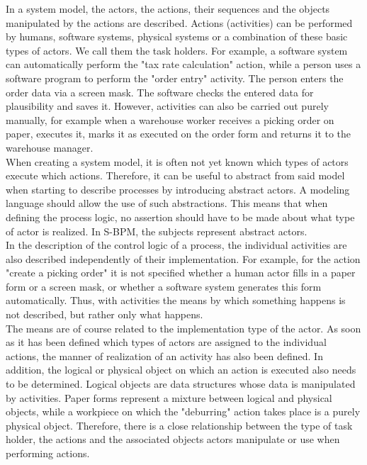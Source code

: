 In a system model, the actors, the actions, their sequences and the objects manipulated by the actions are described. Actions (activities) can be performed by humans, software systems, physical systems or a combination of these basic types of actors. We call them the task holders. For example, a software system can automatically perform the "tax rate calculation" action, while a person uses a software program to perform the "order entry" activity. The person enters the order data via a screen mask. The software checks the entered data for plausibility and saves it. However, activities can also be carried out purely manually, for example when a warehouse worker receives a picking order on paper, executes it, marks it as executed on the order form and returns it to the warehouse manager.\\ 
When creating a system model, it is often not yet known which types of actors execute which actions. Therefore, it can be useful to abstract from said model when starting to describe processes by introducing abstract actors. A modeling language should allow the use of such abstractions. This means that when defining the process logic, no assertion should have to be made about what type of actor is realized. In S-BPM, the subjects represent abstract actors. \\
In the description of the control logic of a process, the individual activities are also described independently of their implementation. For example, for the action "create a picking order" it is not specified whether a human actor fills in a paper form or a screen mask, or whether a software system generates this form automatically. Thus, with activities the means by which something happens is not described, but rather only what happens.\\ 
The means are of course related to the implementation type of the actor. As soon as it has been defined which types of actors are assigned to the individual actions, the manner of realization of an activity has also been defined. In addition, the logical or physical object on which an action is executed also needs to be determined. Logical objects are data structures whose data is manipulated by activities. Paper forms represent a mixture between logical and physical objects, while a workpiece on which the "deburring" action takes place is a purely physical object. Therefore, there is a close relationship between the type of task holder, the actions and the associated objects actors manipulate or use when performing actions.\\
